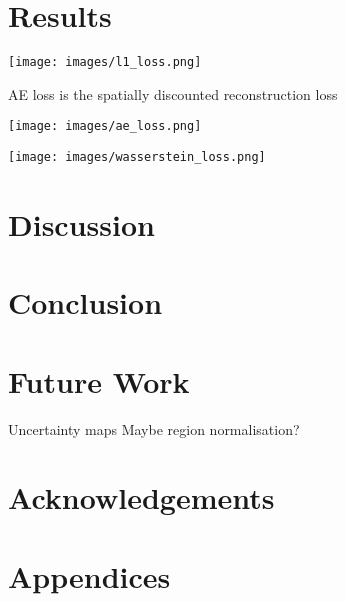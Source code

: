 \documentclass[twocolumn]{article}
\begin{document}
\section{Results}
\label{sec:org4cce4a6}

\begin{center}
\texttt{[image: images/l1\_loss.png]}
\end{center}

AE loss is the spatially discounted reconstruction loss\autocite{zhangVoidFillingBased2020}
\begin{center}
\texttt{[image: images/ae\_loss.png]}
\end{center}

\begin{center}
\texttt{[image: images/wasserstein\_loss.png]}
\end{center}


\section{Discussion}
\label{sec:org9e5926c}

\section{Conclusion}
\label{sec:org487d6df}

\section{Future Work}
\label{sec:org669b0d5}

Uncertainty maps
Maybe region normalisation?\autocite{yuRegionNormalizationImage2023}

\section*{Acknowledgements}

\printbibliography

\section*{Appendices}
\end{document}
